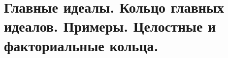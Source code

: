 \section{
    Главные идеалы. Кольцо главных идеалов. Примеры. Целостные и факториальные кольца. 
}




